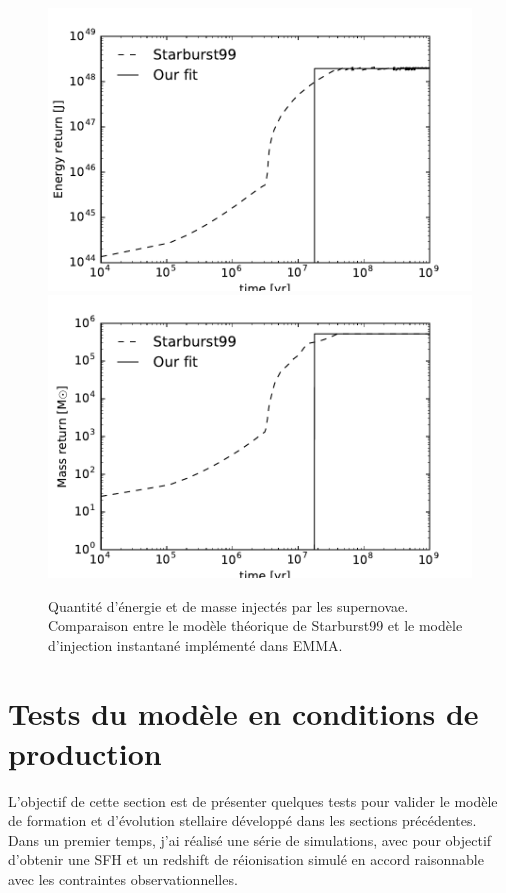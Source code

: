 \begin{figure}
        \includegraphics[width=.95\textwidth]{img/03/energy_loss.pdf} 
		\includegraphics[width=.95\textwidth]{img/03/mass_loss.pdf} 
        \caption[Calibration des supernovæ]{ Quantité d'énergie et de masse injectés par les supernovae. 
        Comparaison entre le modèle théorique de Starburst99 et le modèle d'injection instantané implémenté dans EMMA.
 		\label{fig:SNloss}}
\end{figure}


\section{Tests du modèle en conditions de production}

L'objectif de cette section est de présenter quelques tests pour valider le modèle de formation et d'évolution stellaire développé dans les sections précédentes.
Dans un premier temps, j'ai réalisé une série de simulations, avec pour objectif d'obtenir une \ac{SFH} et un redshift de réionisation simulé en accord raisonnable avec les contraintes observationnelles.

